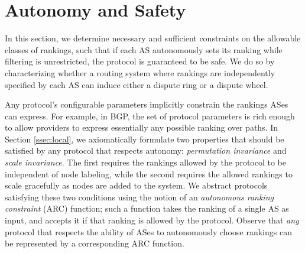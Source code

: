 \section{Autonomy and Safety}
\label{sec:local}


In this section, we determine necessary and sufficient constraints on
the allowable classes of rankings, such that if each AS autonomously
sets its ranking while filtering is unrestricted,
the protocol is guaranteed to be safe.  
We do so by characterizing whether a routing system
where rankings are independently specified by each AS can induce
either a dispute ring or a dispute wheel.

Any protocol's configurable parameters implicitly constrain
the rankings ASes can express.  For example, in BGP, the set of
protocol parameters is rich enough to allow providers to express
essentially any possible ranking over paths.  
In Section \ref{ssec:local}, we
axiomatically formulate two properties that should be satisfied by any
protocol that respects autonomy: {\em permutation invariance} and {\em
scale invariance}.  The first requires the rankings allowed by the
protocol to be independent of node labeling, while the second requires
the allowed rankings to scale gracefully as nodes are added to the
system.  We abstract protocols satisfying these two conditions using
the notion of an {\em autonomous ranking constraint} (ARC) function;
such a function takes the ranking of a single AS as input, and accepts it if
that ranking is allowed by the protocol.  Observe that {\em any}
protocol that respects the ability of ASes to autonomously choose
rankings can be represented by a corresponding ARC function.

